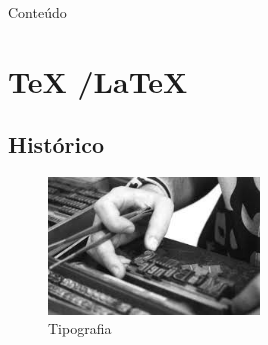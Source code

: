






% 


\begin {frame}{Conteúdo}
\small
    \begin{multicols}{3}
        \tableofcontents
    \end{multicols}
\end {frame}

\section {\TeX{} /\LaTeX{}}
\subsection {Histórico}
\begin{frame}
\begin{figure}[htbp]
    \centering
        \includegraphics[width=0.5\textwidth]{figuras/tipografia.jpeg}
    \caption{Tipografia}
    \label{fig:tipografia}
\end{figure}
\end{frame}

